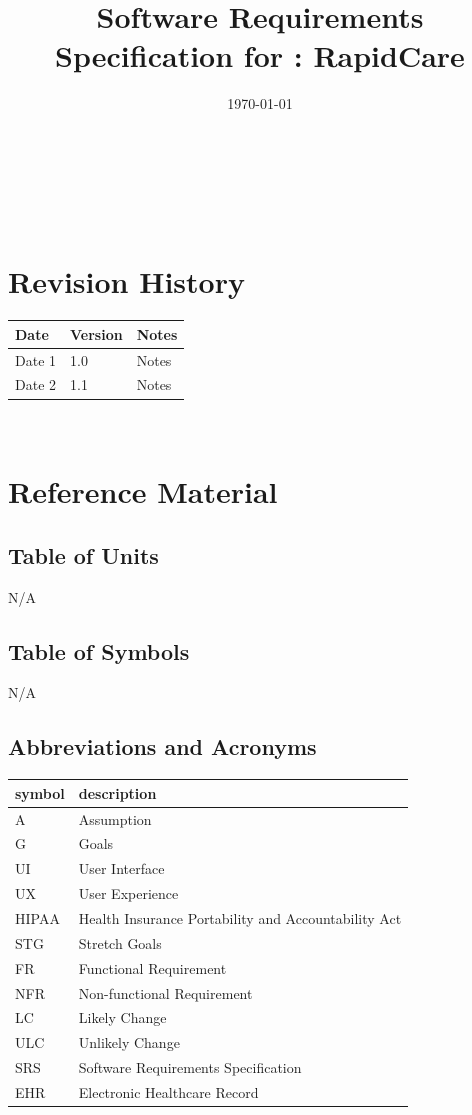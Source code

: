 \documentclass[12pt]{article}
\begin{document}
\title{Software Requirements Specification for \progname: RapidCare}
\author{\authname}
\date{\today}
	
\maketitle

~\newpage


\tableofcontents

~\newpage

\section*{Revision History}

\begin{tabularx}{\textwidth}{p{3cm}p{2cm}X}
\toprule {\bf Date} & {\bf Version} & {\bf Notes}\\
\midrule
Date 1 & 1.0 & Notes\\
Date 2 & 1.1 & Notes\\
\bottomrule
\end{tabularx}

~\newpage

\section{Reference Material}

\subsection{Table of Units}
N/A

\subsection{Table of Symbols}
N/A

\subsection{Abbreviations and Acronyms}

\begin{tabular}{l l} 
  \toprule    
  \textbf{symbol} & \textbf{description}\\
  \midrule 
  A & Assumption\\
  G & Goals\\
  UI & User Interface\\
  UX & User Experience\\
  HIPAA & Health Insurance Portability and Accountability Act\\
  STG & Stretch Goals\\
  FR & Functional Requirement\\
  NFR & Non-functional Requirement\\
  LC & Likely Change\\
  ULC & Unlikely Change\\
  SRS & Software Requirements Specification\\
  EHR & Electronic Healthcare Record\\
  \bottomrule
\end{tabular}\\
\end{document}
